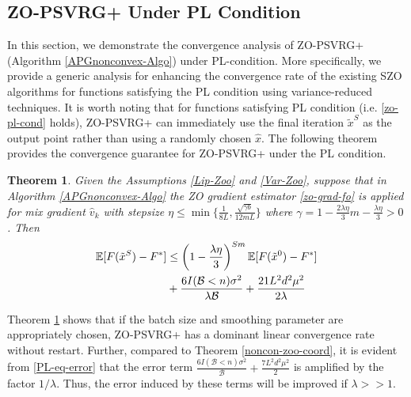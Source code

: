 \documentclass[iicol,sn-basic]{sn-jnl}
\theoremstyle{thmstyleone}%
\newtheorem{theorem}{Theorem}%
\theoremstyle{thmstyletwo}%
\newtheorem{remark}{Remark}%
\theoremstyle{thmstylethree}%
\newcommand*{\E}{\mathbb{E}}
\begin{document}
\subsection{ZO-PSVRG+ Under PL Condition}
In this section, we demonstrate the convergence analysis of ZO-PSVRG+ (Algorithm \ref{APGnonconvex-Algo}) under PL-condition. More specifically, we provide a generic analysis for enhancing the convergence rate of the existing SZO algorithms for functions satisfying the PL condition using variance-reduced techniques. It is worth noting that for functions satisfying PL condition (i.e. \eqref{zo-pl-cond} holds), ZO-PSVRG+ can immediately use the final iteration $\tilde{x}^S$
as the output point rather than using a randomly chosen
$\hat{x}$. 
The following theorem provides the convergence guarantee for ZO-PSVRG+ under the PL condition.
\begin{theorem}\label{PL-Zoo}
Given the Assumptions \ref{Lip-Zoo} and \ref{Var-Zoo}, suppose that in Algorithm \ref{APGnonconvex-Algo} the ZO gradient estimator \eqref{zo-grad-fo} is applied for mix gradient $\hat{v}_k$ with stepsize $\eta \leq \min\{\frac{1}{8L}, \frac{\sqrt{\gamma b}}{12 m L }\}$ where $\gamma = 1-\frac{2\lambda\eta}{3} m-\frac{\lambda\eta}{3} > 0$. Then 
\begin{align}
\E[F(\tilde{x}^S) - {F}^*] & \leq   \left(1-\frac{\lambda\eta}{3}\right)^{Sm} \E[F(\tilde{x}^0) - {F}^*]\notag\\
& + \frac{6I(\mathcal{B} < n) \sigma ^2}{\lambda \mathcal{B}}+\frac{21 L^2 d^2 \mu^2}{2\lambda}\label{PL-eq-error}
\end{align}
\end{theorem}

Theorem \ref{PL-Zoo} shows that if the batch size and smoothing parameter are  appropriately chosen, ZO-PSVRG+ has a dominant linear convergence rate without restart. Further, compared to Theorem \ref{noncon-zoo-coord}, it is evident from \eqref{PL-eq-error} that the  error term $\frac{6I(\mathcal{B} < n) \sigma ^2}{\mathcal{B}}+\frac{7L^2 d^2 \mu^2}{2}$ is amplified by the factor $1/\lambda$. Thus, the error induced by these terms will be improved if $\lambda >> 1$.
\end{document}

